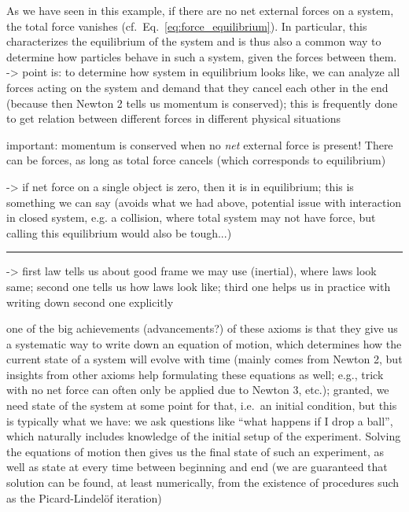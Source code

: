 \documentclass[../class_mech_main.tex]{subfiles}
\begin{document}
As we have seen in this example, if there are no net external forces on a system, the total force vanishes (cf.~Eq.~\eqref{eq:force_equilibrium}). In particular, this characterizes the equilibrium of the system and is thus also a common way to determine how particles behave in such a system, given the forces between them.  -> point is: to determine how system in equilibrium looks like, we can analyze all forces acting on the system and demand that they cancel each other in the end (because then Newton 2 tells us momentum is conserved); this is frequently done to get relation between different forces in different physical situations

important: momentum is conserved when no \emph{net} external force is present! There can be forces, as long as total force cancels (which corresponds to equilibrium)

-> if net force on a single object is zero, then it is in equilibrium; this is something we can say (avoids what we had above, potential issue with interaction in closed system, e.g. a collision, where total system may not have force, but calling this equilibrium would also be tough...)


\hrule


-> first law tells us about good frame we may use (inertial), where laws look same; second one tells us how laws look like; third one helps us in practice with writing down second one explicitly

one of the big achievements (advancements?) of these axioms is that they give us a systematic way to write down an equation of motion, which determines how the current state of a system will evolve with time (mainly comes from Newton 2, but insights from other axioms help formulating these equations as well; e.g., trick with no net force can often only be applied due to Newton 3, etc.); granted, we need state of the system at some point for that, i.e.~an initial condition, but this is typically what we have: we ask questions like \enquote{what happens if I drop a ball}, which naturally includes knowledge of the initial setup of the experiment. Solving the equations of motion then gives us the final state of such an experiment, as well as state at every time between beginning and end (we are guaranteed that solution can be found, at least numerically, from the existence of procedures such as the Picard-Lindelöf iteration)
\end{document}
